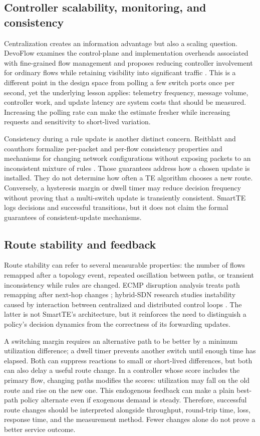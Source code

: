 \subsection{Controller scalability, monitoring, and consistency}
Centralization creates an information advantage but also a scaling question. DevoFlow examines the control-plane and implementation overheads associated with fine-grained flow management and proposes reducing controller involvement for ordinary flows while retaining visibility into significant traffic \cite{devoflow}. This is a different point in the design space from polling a few switch ports once per second, yet the underlying lesson applies: telemetry frequency, message volume, controller work, and update latency are system costs that should be measured. Increasing the polling rate can make the estimate fresher while increasing requests and sensitivity to short-lived variation.

Consistency during a rule update is another distinct concern. Reitblatt and coauthors formalize per-packet and per-flow consistency properties and mechanisms for changing network configurations without exposing packets to an inconsistent mixture of rules \cite{reitblatt}. Those guarantees address how a chosen update is installed. They do not determine how often a TE algorithm chooses a new route. Conversely, a hysteresis margin or dwell timer may reduce decision frequency without proving that a multi-switch update is transiently consistent. SmartTE logs decisions and successful transitions, but it does not claim the formal guarantees of consistent-update mechanisms.

\subsection{Route stability and feedback}
Route stability can refer to several measurable properties: the number of flows remapped after a topology event, repeated oscillation between paths, or transient inconsistency while rules are changed. ECMP disruption analysis treats path remapping after next-hop changes \cite{rfc2992}; hybrid-SDN research studies instability caused by interaction between centralized and distributed control loops \cite{tseng2019}. The latter is not SmartTE's architecture, but it reinforces the need to distinguish a policy's decision dynamics from the correctness of its forwarding updates.

A switching margin requires an alternative path to be better by a minimum utilization difference; a dwell timer prevents another switch until enough time has elapsed. Both can suppress reactions to small or short-lived differences, but both can also delay a useful route change. In a controller whose score includes the primary flow, changing paths modifies the scores: utilization may fall on the old route and rise on the new one. This endogenous feedback can make a plain best-path policy alternate even if exogenous demand is steady. Therefore, successful route changes should be interpreted alongside throughput, round-trip time, loss, response time, and the measurement method. Fewer changes alone do not prove a better service outcome.

